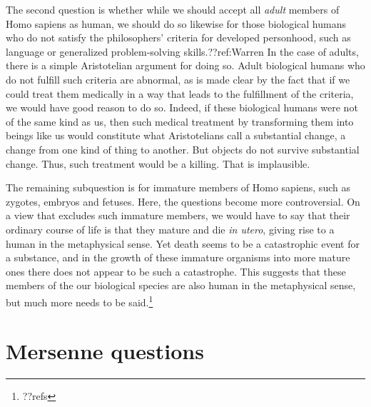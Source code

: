 The second question is whether while we should accept all \textit{adult} members of Homo sapiens as human, we should do so likewise for those 
biological humans who do not satisfy the philosophers' criteria for developed personhood, such as language or generalized problem-solving skills.??ref:Warren
In the case of adults, there is a simple Aristotelian argument for doing so. Adult biological humans who do not fulfill such criteria are abnormal, as is made clear
by the fact that if we could treat them medically in a way that leads to the fulfillment of the criteria, we would have good reason to do so. Indeed, if these
biological humans were not of the same kind as us, then such medical treatment by transforming them into beings like us would constitute what Aristotelians
call a substantial change, a change from one kind of thing to another. But objects do not survive substantial change. Thus, such treatment would be a killing.
That is implausible.

The remaining subquestion is for immature members of Homo sapiens, such as zygotes, embryos and fetuses. Here, the questions become more controversial.
On a view that excludes such immature members, we would have to say that their ordinary course of life is that they mature and die \textit{in utero}, giving
rise to a human in the metaphysical sense. Yet death seems to be a catastrophic event for a substance, and in the growth of these immature organisms into more mature ones
there does not appear to be such a catastrophe. This suggests that these members of the our biological species are also human in the metaphysical sense, but much
more needs to be said.\footnote{??refs}

\section{Mersenne questions}
